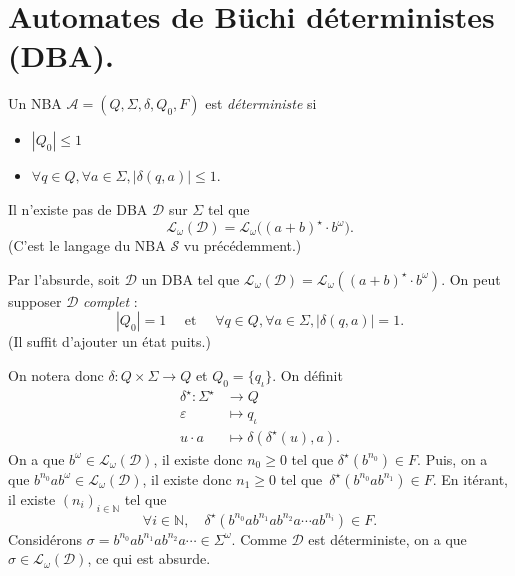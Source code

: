 \documentclass[./main]{subfiles}
\begin{document}
  \section{Automates de Büchi déterministes (DBA).}

  \begin{defn}
    Un NBA $\mathcal{A} = (Q, \Sigma, \delta, Q_0, F)$ est \textit{déterministe} si
    \begin{itemize}
      \item $|Q_0| \le 1$
      \item $\forall q \in Q, \forall a \in \Sigma, |\delta(q, a)| \le 1$.
    \end{itemize}
  \end{defn}

  \begin{prop}
    Il n'existe pas de DBA $\mathcal{D}$ sur $\Sigma$ tel que 
    \[
    \mathcal{L}_\omega(\mathcal{D}) = \mathcal{L}_\omega\big((a+b)^\star \cdot b^\omega\big)
    .\]
    (C'est le langage du NBA $\mathcal{S}$ vu précédemment.)
  \end{prop}
  \begin{prv}
    Par l'absurde, soit $\mathcal{D}$ un DBA tel que $\mathcal{L}_\omega(\mathcal{D}) = \mathcal{L}_\omega((a+b)^\star \cdot b^\omega)$.
    On peut supposer $\mathcal{D}$ \textit{complet} :
    \[
    |Q_0| = 1 \quad\text{ et }\quad \forall q \in Q, \forall a \in \Sigma, |\delta(q, a)| = 1
    .\]
    (Il suffit d'ajouter un état puits.)

    On notera donc $\delta : Q \times \Sigma \to Q$ et $Q_0 = \{q_\iota\}$.
    On définit
    \begin{align*}
      \delta^\star: \Sigma^\star &\longrightarrow Q \\
       \varepsilon &\longmapsto q_\iota \\
       u \cdot a &\longmapsto \delta(\delta^\star(u), a)
    .\end{align*}
    On a que $b^\omega \in \mathcal{L}_\omega(\mathcal{D})$, il existe donc $n_0 \ge 0$ tel que $\delta^\star(b^{n_0}) \in F$.
    Puis, on a que $b^{n_0} a b^\omega \in \mathcal{L}_\omega(\mathcal{D})$,
    il existe donc $n_1 \ge 0$ tel que~$\delta^\star(b^{n_0} a b^{n_1}) \in F$.
    En itérant, il existe $(n_i)_{i \in \mathds{N}}$ tel que 
    \[
    \forall i \in \mathds{N}, \quad\delta^\star(b^{n_0} a b ^{n_1} a b ^{n_2} a \cdots a b^{n_i}) \in F
    .\]
    Considérons $\sigma = b^{n_0} a b^{n_1} a b^{n_2} a \cdots \in \Sigma^\omega$.
    Comme $\mathcal{D}$ est déterministe, on a que $\sigma \in \mathcal{L}_\omega(\mathcal{D})$, ce qui est absurde.
  \end{prv}
\end{document}
